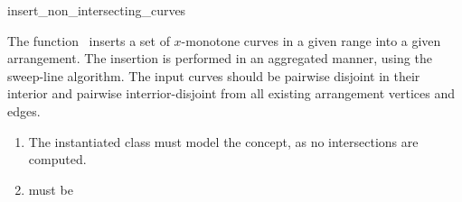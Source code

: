 \ccRefPageBegin

\begin{ccRefFunction}{insert_non_intersecting_curves}

\ccDefinition

The function \ccRefName\ inserts a set of $x$-monotone curves in a given
range into a given arrangement. The insertion is performed in an aggregated
manner, using the sweep-line algorithm. The input curves should be pairwise
disjoint in their interior and pairwise interrior-disjoint from all existing
arrangement vertices and edges. 



\begin{enumerate}
\item The instantiated  class must model the
   concept, as no intersections are computed.
\item {} must be 
\end{enumerate}

\end{ccRefFunction}

\ccRefPageEnd
